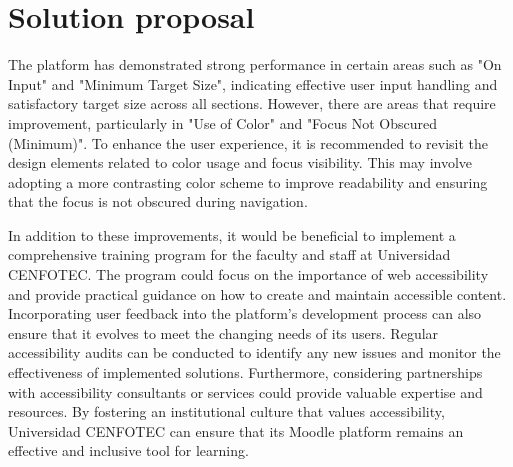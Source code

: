 \documentclass{IEEEtran}
\begin{document}
\section{Solution proposal}
The platform has demonstrated strong performance in certain areas such as "On Input" and "Minimum Target Size", indicating effective user input handling and satisfactory target size across all sections. However, there are areas that require improvement, particularly in "Use of Color" and "Focus Not Obscured (Minimum)". To enhance the user experience, it is recommended to revisit the design elements related to color usage and focus visibility. This may involve adopting a more contrasting color scheme to improve readability and ensuring that the focus is not obscured during navigation. 

In addition to these improvements, it would be beneficial to implement a comprehensive training program for the faculty and staff at Universidad CENFOTEC. The program could focus on the importance of web accessibility and provide practical guidance on how to create and maintain accessible content. Incorporating user feedback into the platform's development process can also ensure that it evolves to meet the changing needs of its users. Regular accessibility audits can be conducted to identify any new issues and monitor the effectiveness of implemented solutions. Furthermore, considering partnerships with accessibility consultants or services could provide valuable expertise and resources. By fostering an institutional culture that values accessibility, Universidad CENFOTEC can ensure that its Moodle platform remains an effective and inclusive tool for learning.
\end{document}
